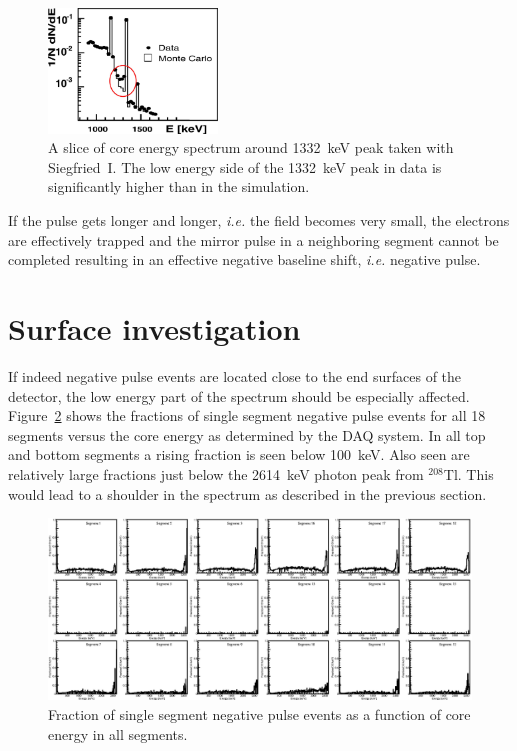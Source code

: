 \begin{figure}
\centering
\includegraphics[width=0.4\textwidth]{dmcnew}
\caption{A slice of core energy spectrum around 1332~keV peak taken
with Siegfried~I. The low energy side of the 1332~keV peak in data is
significantly higher than in the simulation.}
\label{fig:np:shou}
\end{figure}

If the pulse gets longer and longer, \textit{i.e.} the field becomes
very small, the electrons are effectively trapped and the mirror pulse
in a neighboring segment cannot be completed resulting in an effective
negative baseline shift, \textit{i.e.} negative pulse.

\section{Surface investigation}
\label{sec:np:inv}
If indeed negative pulse events are located close to the end surfaces
of the detector, the low energy part of the spectrum should be
especially affected. Figure~\ref{fig:np:fracall} shows the fractions
of single segment negative pulse events for all 18 segments versus the
core energy as determined by the DAQ system. In all top and bottom
segments a rising fraction is seen below 100~keV. Also seen are
relatively large fractions just below the 2614~keV photon peak from
$^{208}$Tl. This would lead to a shoulder in the spectrum as described
in the previous section.

\begin{figure}
\centering
\includegraphics{NegFractionAll}
\caption{Fraction of single segment negative pulse events as a
function of core energy in all segments.}
\label{fig:np:fracall}
\end{figure}


